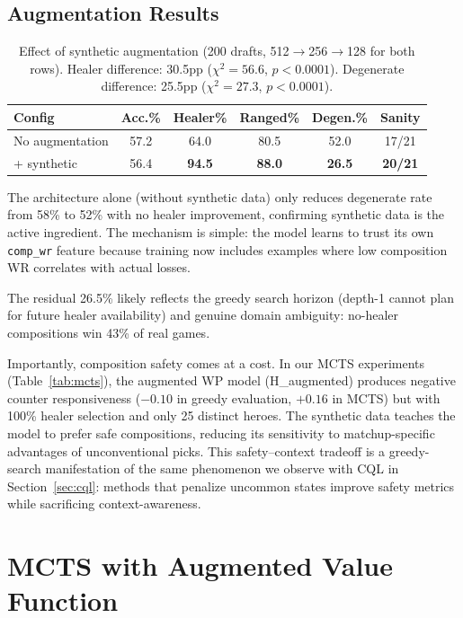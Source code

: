 \documentclass[journal]{IEEEtran}
\begin{document}
\subsection{Augmentation Results}

\begin{table}[t]
\centering
\caption{Effect of synthetic augmentation (200 drafts, 512$\to$256$\to$128 for both rows). Healer difference: 30.5pp ($\chi^2 = 56.6$, $p < 0.0001$). Degenerate difference: 25.5pp ($\chi^2 = 27.3$, $p < 0.0001$).}
\label{tab:synth}
\begin{tabular}{lccccc}
\toprule
Config & Acc.\% & Healer\% & Ranged\% & Degen.\% & Sanity \\
\midrule
No augmentation & 57.2 & 64.0 & 80.5 & 52.0 & 17/21 \\
+ synthetic & 56.4 & \textbf{94.5} & \textbf{88.0} & \textbf{26.5} & \textbf{20/21} \\
\bottomrule
\end{tabular}
\end{table}

The architecture alone (without synthetic data) only reduces degenerate rate from 58\% to 52\% with no healer improvement, confirming synthetic data is the active ingredient. The mechanism is simple: the model learns to trust its own \texttt{comp\_wr} feature because training now includes examples where low composition WR correlates with actual losses.

The residual 26.5\% likely reflects the greedy search horizon (depth-1 cannot plan for future healer availability) and genuine domain ambiguity: no-healer compositions win 43\% of real games.

Importantly, composition safety comes at a cost. In our MCTS experiments (Table~\ref{tab:mcts}), the augmented WP model (H\_augmented) produces negative counter responsiveness ($-0.10$ in greedy evaluation, $+0.16$ in MCTS) but with 100\% healer selection and only 25 distinct heroes. The synthetic data teaches the model to prefer safe compositions, reducing its sensitivity to matchup-specific advantages of unconventional picks. This safety--context tradeoff is a greedy-search manifestation of the same phenomenon we observe with CQL in Section~\ref{sec:cql}: methods that penalize uncommon states improve safety metrics while sacrificing context-awareness.

\section{MCTS with Augmented Value Function}
\end{document}

